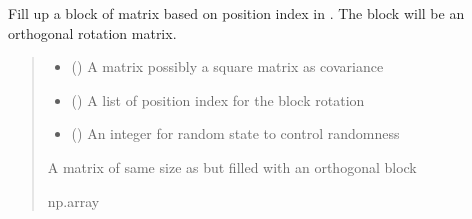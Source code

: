 \documentclass[letterpaper,10pt,english]{sphinxmanual}
\begin{document}

\begin{fulllineitems}
\label{\detokenize{Utilities:pysimrel.utilities.get_rotate}}
\pysigstartsignatures
{}
\pysigstopsignatures
\sphinxAtStartPar
Fill up a block of matrix  based on position index in .
The block will be an orthogonal rotation matrix.
\begin{quote}\begin{description}
\begin{itemize}
\item {} 
\sphinxAtStartPar
{} () \textendash{} A matrix possibly a square matrix as covariance

\item {} 
\sphinxAtStartPar
{} () \textendash{} A list of position index for the block rotation

\item {} 
\sphinxAtStartPar
{} () \textendash{} An integer for random state to control randomness

\end{itemize}

\sphinxAtStartPar
A matrix of same size as  but filled with an orthogonal block

\sphinxAtStartPar
np.array

\end{description}\end{quote}

\end{fulllineitems}

\end{document}
